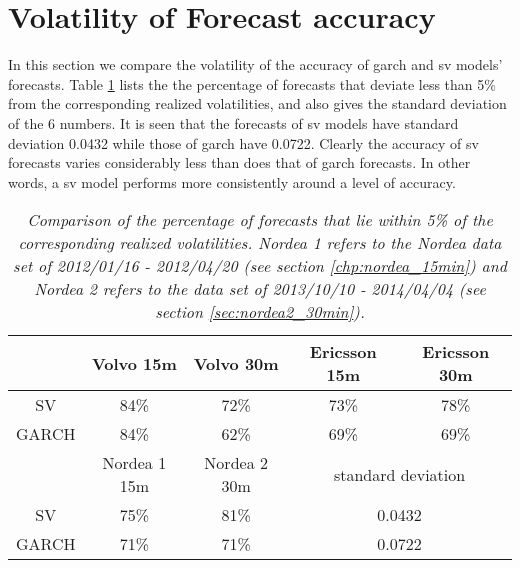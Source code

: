 \section{Volatility of Forecast accuracy}
\label{sec:forecast_volatility}
In this section we compare the volatility of the accuracy of
\gls{garch} and \gls{sv} models' forecasts. Table
\ref{tab:5percent_values} lists the the percentage of forecasts
that deviate less than 5\% from the corresponding realized
volatilities, and also gives the standard deviation of the 6 numbers.
It is seen that the forecasts of \gls{sv} models have standard
deviation 0.0432 while those of \gls{garch} have 0.0722. Clearly the
accuracy of \gls{sv} forecasts varies considerably less than does that
of \gls{garch} forecasts. In other words, a \gls{sv} model performs
more consistently around a level of accuracy.
  \begin{table}[htb!]
    \centering
    \begin{tabular}{|c|c|c|c|c|}
      \hline
      & Volvo 15m & Volvo 30m & Ericsson 15m & Ericsson 30m \\
      \hline
      SV & 84\% & 72\% & 73\% & 78\% \\
      \hline
      GARCH & 84\% & 62\% & 69\% & 69\% \\
      \hline
      \hline
      & Nordea 1 15m & Nordea 2 30m & \multicolumn{2}{c|}{standard deviation}\\
      \hline
      SV & 75\% & 81\% & \multicolumn{2}{c|}{0.0432} \\
      \hline
      GARCH & 71\% & 71\% & \multicolumn{2}{c|}{0.0722} \\
      \hline
    \end{tabular}
    \caption{\small \it Comparison of the percentage of forecasts that
      lie within 5\% of the corresponding realized
      volatilities. Nordea 1 refers to the Nordea data set of
      2012/01/16 - 2012/04/20 (see section \ref{chp:nordea_15min})
      and Nordea 2 refers to the data set of 2013/10/10 - 2014/04/04
      (see section \ref{sec:nordea2_30min}).}
    \label{tab:5percent_values}
  \end{table}


